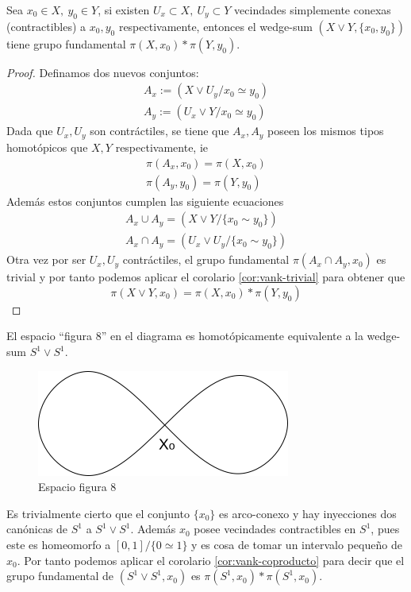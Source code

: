 \begin{corolario}
  \label{cor:vank-coproducto}
  Sea \(x_0 \in X, \ y_0 \in Y\), si existen \(U_x \subset X, \ U_y
  \subset Y\) vecindades simplemente conexas (contractibles) a \(x_0,
  y_0\) respectivamente, entonces el wedge-sum \((X \vee Y , \{x_0 ,
  y_0\})\) tiene grupo fundamental \(\pi (X, x_0) * \pi (Y, y_0)\).
\end{corolario}
\begin{proof}
  Definamos dos nuevos conjuntos:
  \begin{gather*}
    A_x := (X \vee U_y / {x_0 \simeq y_0}) \\
    A_y := (U_x \vee Y / {x_0 \simeq y_0})
  \end{gather*}
  Dada que \(U_x, U_y\) son contráctiles, se tiene que \(A_x, A_y\)
  poseen los mismos tipos homotópicos que \(X, Y\) respectivamente, ie
  \begin{gather*}
    \pi (A_x , x_0) = \pi (X, x_0) \\
    \pi (A_y , y_0) = \pi (Y, y_0)
  \end{gather*}
  Además estos conjuntos cumplen las siguiente ecuaciones
  \begin{gather*}
    A_x \cup A_y = (X \vee Y / \{ x_0 \sim y_0\}) \\
    A_x \cap A_y = (U_x \vee U_y / \{ x_0 \sim y_0\})
  \end{gather*}
  Otra vez por ser \(U_x, U_y\) contráctiles, el grupo fundamental
  \(\pi (A_x \cap A_y, x_0)\) es trivial y por tanto podemos aplicar el
  corolario \ref{cor:vank-trivial} para obtener que
  \[ \pi (X \vee Y, x_0) = \pi (X, x_0) * \pi (Y, y_0) \]
\end{proof}

\begin{ejemplo}
El espacio ``figura 8'' en el diagrama es homotópicamente equivalente a
la wedge-sum \(S^1 \vee S^1\).
  \begin{figure}[h]
    \centering \includegraphics[scale=0.5]{./imagenes/figura8.png}
    \caption*{Espacio figura 8}
  \end{figure}
  Es trivialmente cierto que el conjunto \(\{x_0\}\) es arco-conexo y
  hay inyecciones dos canónicas de \(S^1\) a \(S^1 \vee S^1\). Además
  \(x_0\) posee vecindades contractibles en \(S^1\), pues este es
  homeomorfo a \([0,1]/ \{0 \simeq 1\}\) y es cosa de tomar un intervalo
  pequeño de \(x_0\). Por tanto podemos aplicar el corolario
  \ref{cor:vank-coproducto} para decir que el grupo fundamental de
  \(\left( S^1 \vee S^1 , x_0 \right) \) es \(\pi \left( S^1 , x_0 \right)
  * \pi \left( S^1 , x_0 \right) \).
\end{ejemplo}

